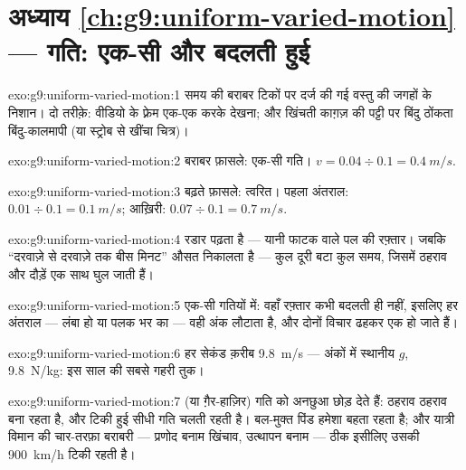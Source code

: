 \section*{अध्याय \ref{ch:g9:uniform-varied-motion} --- गति: एक-सी और बदलती हुई}

\begin{solution}{exo:g9:uniform-varied-motion:1}
समय की बराबर टिकों पर दर्ज की गई वस्तु की जगहों के निशान। दो तरीक़े:
वीडियो के फ़्रेम एक-एक करके देखना; और खिंचती काग़ज़ की पट्टी पर बिंदु
ठोंकता बिंदु-कालमापी (या स्ट्रोब से खींचा चित्र)।
\end{solution}

\begin{solution}{exo:g9:uniform-varied-motion:2}
बराबर फ़ासले: एक-सी गति। $v = 0.04 \div 0.1 = \qty{0.4}{m/s}$.
\end{solution}

\begin{solution}{exo:g9:uniform-varied-motion:3}
बढ़ते फ़ासले: त्वरित। पहला अंतराल: $0.01 \div 0.1 = \qty{0.1}{m/s}$;
आख़िरी: $0.07 \div 0.1 = \qty{0.7}{m/s}$.
\end{solution}

\begin{solution}{exo:g9:uniform-varied-motion:4}
रडार  पढ़ता है --- यानी फाटक वाले पल की रफ़्तार। जबकि
``दरवाज़े से दरवाज़े तक बीस मिनट'' औसत निकालता है --- कुल दूरी बटा कुल
समय, जिसमें ठहराव और दौड़ें एक साथ घुल जाती हैं।
\end{solution}

\begin{solution}{exo:g9:uniform-varied-motion:5}
एक-सी गतियों में: वहाँ रफ़्तार कभी बदलती ही नहीं, इसलिए हर अंतराल ---
लंबा हो या पलक भर का --- वही अंक लौटाता है, और दोनों विचार ढहकर एक हो
जाते हैं।
\end{solution}

\begin{solution}{exo:g9:uniform-varied-motion:6}
हर सेकंड क़रीब \qty{9.8}{m/s} --- अंकों में स्थानीय $g$,
\qty{9.8}{N/kg}: इस साल की सबसे गहरी तुक।
\end{solution}

\begin{solution}{exo:g9:uniform-varied-motion:7}
 (या ग़ैर-हाज़िर)  गति को अनछुआ छोड़ देते हैं: ठहराव ठहराव
बना रहता है, और टिकी हुई सीधी गति चलती रहती है। बल-मुक्त पिंड हमेशा
बहता रहता है; और यात्री विमान की चार-तरफ़ा बराबरी --- प्रणोद बनाम
खिंचाव, उत्थापन बनाम  --- ठीक इसीलिए उसकी \qty{900}{km/h} टिकी
रहती है।
\end{solution}

